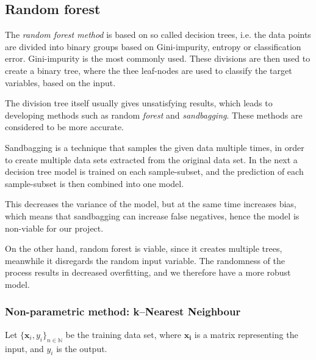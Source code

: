     
    \subsection{Random forest}
    
    The \emph{random forest method} is  based on so called decision trees, i.e. the data points are divided into binary groups based on Gini-impurity, entropy or classification error. Gini-impurity is the most commonly used. These divisions are then used to create a binary tree, where the thee leaf-nodes are used to classify the target variables, based on the input.
    
    The division tree itself usually gives unsatisfying results, which leads to developing methods such as random \emph{forest} and \emph{sandbagging}. These methods are considered to be more accurate.
    
    Sandbagging is a technique that samples the given data multiple times, in order to create multiple data sets extracted from the original data set. In the next a decision tree model is trained on each sample-subset, and the prediction of each sample-subset is then combined into one model. 
    
    This decreases the variance of the model, but at the same time increases bias, which means that sandbagging can increase false negatives, hence the model is non-viable for our project.
    
    On the other hand, random forest is viable, since it creates multiple trees, meanwhile it disregards the random input variable. The randomness of the process results in decreased overfitting, and we therefore have a more robust model.
    
 
    
    \subsubsection{Non-parametric method: k--Nearest Neighbour}
    Let $\{ \boldsymbol{x}_i, y_i \}_{n \in \mathbb{N}}$ be the training data set, where $\boldsymbol{x_i}$ is a matrix representing the input, and $y_i$ is the  output.
    
